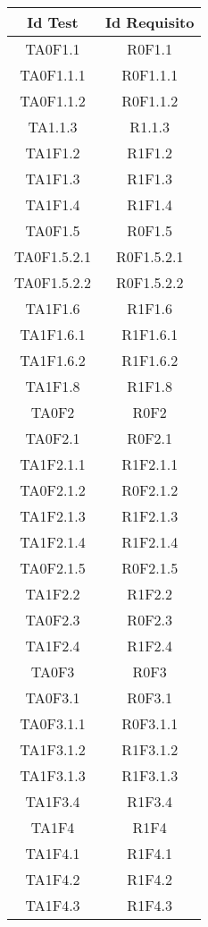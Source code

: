      \begin{longtable}{|c|c|}
     	\hline
     	\textbf{Id Test} & \textbf{Id Requisito}\\
     	\hline
     	\endhead
     	TA0F1.1&R0F1.1 \\ \hline
     	TA0F1.1.1&R0F1.1.1 \\ \hline
     	TA0F1.1.2&R0F1.1.2 \\ \hline
     	TA1.1.3&R1.1.3 \\ \hline
     	TA1F1.2&R1F1.2 \\ \hline
     	TA1F1.3&R1F1.3 \\ \hline
     	TA1F1.4&R1F1.4 \\ \hline
     	TA0F1.5&R0F1.5 \\ \hline
     	TA0F1.5.2.1&R0F1.5.2.1 \\ \hline
     	TA0F1.5.2.2&R0F1.5.2.2 \\ \hline
     	TA1F1.6&R1F1.6 \\ \hline
     	TA1F1.6.1&R1F1.6.1 \\ \hline
     	TA1F1.6.2&R1F1.6.2 \\ \hline
     	TA1F1.8&R1F1.8 \\ \hline
     	TA0F2&R0F2 \\ \hline
     	TA0F2.1&R0F2.1 \\ \hline
     	TA1F2.1.1&R1F2.1.1 \\ \hline
     	TA0F2.1.2&R0F2.1.2 \\ \hline
     	TA1F2.1.3&R1F2.1.3 \\ \hline
     	TA1F2.1.4&R1F2.1.4 \\ \hline
     	TA0F2.1.5&R0F2.1.5 \\ \hline
     	TA1F2.2&R1F2.2 \\ \hline
     	TA0F2.3&R0F2.3 \\ \hline
     	TA1F2.4&R1F2.4 \\ \hline
     	TA0F3&R0F3 \\ \hline
     	TA0F3.1&R0F3.1 \\ \hline
     	TA0F3.1.1&R0F3.1.1 \\ \hline
     	TA1F3.1.2&R1F3.1.2 \\ \hline
     	TA1F3.1.3&R1F3.1.3 \\ \hline
     	TA1F3.4&R1F3.4 \\ \hline
     	TA1F4&R1F4 \\ \hline
     	TA1F4.1&R1F4.1 \\ \hline
     	TA1F4.2&R1F4.2 \\ \hline
     	TA1F4.3&R1F4.3 \\ \hline
     \end{longtable}
	
	
